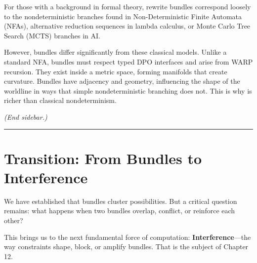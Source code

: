 For those with a background in formal theory, rewrite bundles correspond loosely to the nondeterministic branches found in Non-Deterministic Finite Automata (NFAs), alternative reduction sequences in lambda calculus, or Monte Carlo Tree Search (MCTS) branches in AI.

However, \COMPUTER{} bundles differ significantly from these classical models. Unlike a standard NFA, bundles must respect typed DPO interfaces and arise from WARP recursion. They exist inside a metric space, forming manifolds that create curvature. Bundles have adjacency and geometry, influencing the shape of the worldline in ways that simple nondeterministic branching does not. This is why \COMPUTER{} is richer than classical nondeterminism.

\emph{(End sidebar.)}

\begin{center}\rule{0.5\linewidth}{0.5pt}\end{center}

\section{\texorpdfstring{\textbf{Transition: From Bundles to Interference}}{11.8 --- Transition: From Bundles to Interference}}

We have established that bundles cluster possibilities. But a critical question remains: what happens when two bundles overlap, conflict, or reinforce each other?

This brings us to the next fundamental force of computation: \textbf{Interference}—the way constraints shape, block, or amplify bundles. That is the subject of Chapter 12.
